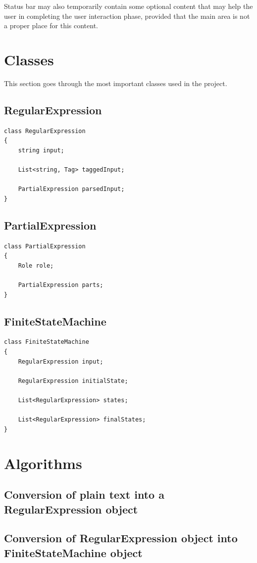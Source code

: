\documentclass{article}
\begin{document}
Status bar may also temporarily contain some optional content that may help the user in completing
the user interaction phase, provided that the main area is not a proper place for this content.

\section{Classes}
This section goes through the most important classes used in the project.

\subsection{RegularExpression}

\begin{verbatim}
class RegularExpression
{
	string input;
	
	List<string, Tag> taggedInput;
	
	PartialExpression parsedInput;
}
\end{verbatim}

\subsection{PartialExpression}

\begin{verbatim}
class PartialExpression
{
	Role role;

	PartialExpression parts;
}
\end{verbatim}

\subsection{FiniteStateMachine}

\begin{verbatim}
class FiniteStateMachine
{
	RegularExpression input;
	
	RegularExpression initialState;
	
	List<RegularExpression> states;
	
	List<RegularExpression> finalStates;
}
\end{verbatim}

\section{Algorithms}

\subsection{Conversion of plain text into a RegularExpression object}

\subsection{Conversion of RegularExpression object into FiniteStateMachine object}
\end{document}
